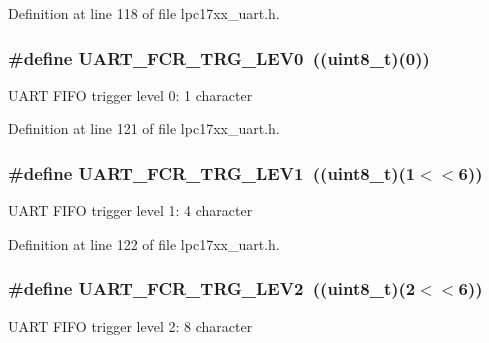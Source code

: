 \-Definition at line 118 of file lpc17xx\-\_\-uart.\-h.

\hypertarget{group___u_a_r_t___private___macros_gaba4b4e15936a075bf5054776fbd59676}{
\subsubsection[{\-U\-A\-R\-T\-\_\-\-F\-C\-R\-\_\-\-T\-R\-G\-\_\-\-L\-E\-V0}]{\setlength{\rightskip}{0pt plus 5cm}\#define {\bf \-U\-A\-R\-T\-\_\-\-F\-C\-R\-\_\-\-T\-R\-G\-\_\-\-L\-E\-V0}~((uint8\-\_\-t)(0))}}\label{group___u_a_r_t___private___macros_gaba4b4e15936a075bf5054776fbd59676}
\-U\-A\-R\-T \-F\-I\-F\-O trigger level 0\-: 1 character 

\-Definition at line 121 of file lpc17xx\-\_\-uart.\-h.

\hypertarget{group___u_a_r_t___private___macros_ga264238c2dde9248a73d679c32a74004b}{
\subsubsection[{\-U\-A\-R\-T\-\_\-\-F\-C\-R\-\_\-\-T\-R\-G\-\_\-\-L\-E\-V1}]{\setlength{\rightskip}{0pt plus 5cm}\#define {\bf \-U\-A\-R\-T\-\_\-\-F\-C\-R\-\_\-\-T\-R\-G\-\_\-\-L\-E\-V1}~((uint8\-\_\-t)(1$<$$<$6))}}\label{group___u_a_r_t___private___macros_ga264238c2dde9248a73d679c32a74004b}
\-U\-A\-R\-T \-F\-I\-F\-O trigger level 1\-: 4 character 

\-Definition at line 122 of file lpc17xx\-\_\-uart.\-h.

\hypertarget{group___u_a_r_t___private___macros_ga7b655aba90b695210e7ce9f7b00cea89}{
\subsubsection[{\-U\-A\-R\-T\-\_\-\-F\-C\-R\-\_\-\-T\-R\-G\-\_\-\-L\-E\-V2}]{\setlength{\rightskip}{0pt plus 5cm}\#define {\bf \-U\-A\-R\-T\-\_\-\-F\-C\-R\-\_\-\-T\-R\-G\-\_\-\-L\-E\-V2}~((uint8\-\_\-t)(2$<$$<$6))}}\label{group___u_a_r_t___private___macros_ga7b655aba90b695210e7ce9f7b00cea89}
\-U\-A\-R\-T \-F\-I\-F\-O trigger level 2\-: 8 character 

